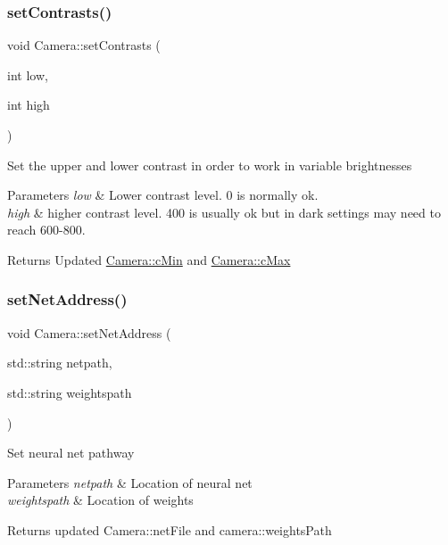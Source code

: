 \subsubsection{\texorpdfstring{set\+Contrasts()}{setContrasts()}}
{\footnotesize\ttfamily void Camera\+::set\+Contrasts (\begin{DoxyParamCaption}\item[{int}]{low,  }\item[{int}]{high }\end{DoxyParamCaption})}

Set the upper and lower contrast in order to work in variable brightnesses


\begin{DoxyParams}{Parameters}
{\em low} & Lower contrast level. 0 is normally ok.\\
\hline
{\em high} & higher contrast level. 400 is usually ok but in dark settings may need to reach 600-\/800.\\
\hline
\end{DoxyParams}
\begin{DoxyReturn}{Returns}
Updated \hyperlink{classCamera_ab6f982f42917eb9ef75606e97fc82911}{Camera\+::c\+Min} and \hyperlink{classCamera_ad784af65b7f7e1b6ebb9b33df774d7db}{Camera\+::c\+Max} 
\end{DoxyReturn}
\mbox{\label{classCamera_a3595618ceff1b74e79633b4132ada11f}} 
\subsubsection{\texorpdfstring{set\+Net\+Address()}{setNetAddress()}}
{\footnotesize\ttfamily void Camera\+::set\+Net\+Address (\begin{DoxyParamCaption}\item[{std\+::string}]{netpath,  }\item[{std\+::string}]{weightspath }\end{DoxyParamCaption})}

Set neural net pathway


\begin{DoxyParams}{Parameters}
{\em netpath} & Location of neural net\\
\hline
{\em weightspath} & Location of weights\\
\hline
\end{DoxyParams}
\begin{DoxyReturn}{Returns}
updated Camera\+::net\+File and camera\+::weights\+Path 
\end{DoxyReturn}
\mbox{\label{classCamera_a9409482c4422823f73d45b3d5e29304b}} 
